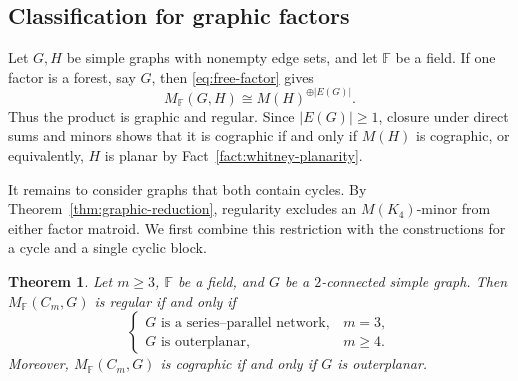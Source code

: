 \documentclass[12pt,a4paper]{article}
\numberwithin{equation}{section}
\newcommand{\F}{\mathbb F}
\newtheorem{theorem}{Theorem}[section]
\theoremstyle{definition}
\theoremstyle{remark}
\begin{document}
\subsection{Classification for graphic factors}\label{subsec:graphic-classification}
Let \(G,H\) be simple graphs with nonempty edge sets, and let
\(\F\) be a field.  If one factor is a forest, say \(G\), then
\eqref{eq:free-factor} gives
\[
M_{\F}(G,H)\cong M(H)^{\oplus |E(G)|}.
\]
Thus the product is graphic and regular.  Since \(|E(G)|\ge1\),
closure under direct sums and minors shows that it is cographic
if and only if \(M(H)\) is cographic, or equivalently, \(H\) is
planar by Fact~\ref{fact:whitney-planarity}.

It remains to consider graphs that both contain cycles.
By Theorem~\ref{thm:graphic-reduction}, regularity excludes an
\(M(K_4)\)-minor from either factor matroid.  We first combine
this restriction with the constructions for a cycle and a single
cyclic block.
\begin{theorem}
\label{thm:local-classification}
Let \(m\ge3\), \(\F\) be a field, and \(G\) be a \(2\)-connected simple graph.  Then \(M_{\F}(C_m,G)\) is regular if and only if
\[
 \begin{cases}
 G\text{ is a series--parallel network},&m=3,\\
 G\text{ is outerplanar},&m\ge4.
 \end{cases}
\]
Moreover, \(M_{\F}(C_m,G)\) is cographic if and only if \(G\) is outerplanar.
\end{theorem}
\end{document}

